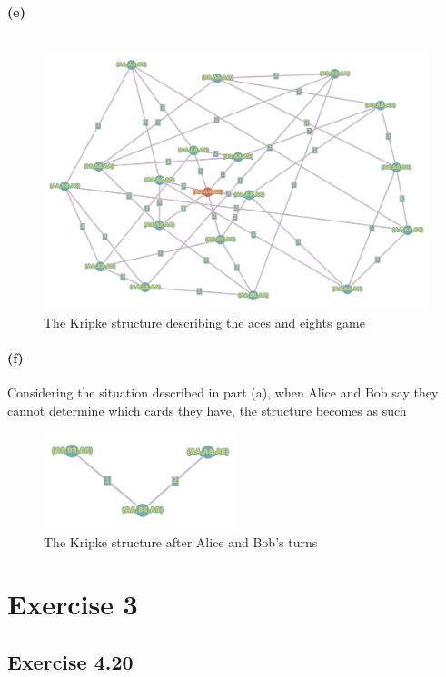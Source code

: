 \documentclass[a4paper,11pt]{article}
\begin{document}
\paragraph{(e)}
\[\] %
\begin{figure}[h]
	\centering
	\includegraphics[width=1\textwidth]{aces_eights_kripke}
	\caption{The Kripke structure describing the aces and eights game}
\end{figure}

\paragraph{(f)} Considering the situation described in part (a), when Alice and Bob say they cannot determine which cards they have, the structure becomes as such
\begin{figure}[h]
	\centering
	\includegraphics[width=0.5\textwidth]{aces_eights_kripke_f}
	\caption{The Kripke structure after Alice and Bob's turns}
\end{figure}


\section*{Exercise 3}

\subsection*{Exercise 4.20}
\end{document}
